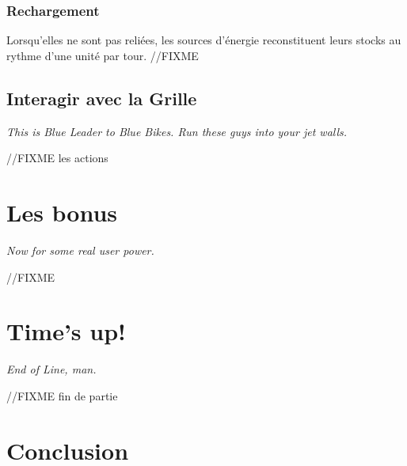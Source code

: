 \subsubsection{Rechargement}

Lorsqu'elles ne sont pas reliées, les sources d'énergie reconstituent leurs
stocks au rythme d'une unité par tour. //FIXME



        \subsection{Interagir avec la Grille}
        \emph{This is Blue Leader to Blue Bikes. Run these guys into your jet walls.}

        //FIXME les actions


\newpage
\section{Les bonus} \label{section-bonus}
\emph{Now for some real user power.}

//FIXME

\newpage
\section{Time's up!}
\emph{End of Line, man.}

//FIXME fin de partie

\newpage
\section{Conclusion}
